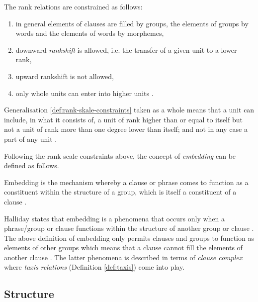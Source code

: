     \begin{generalization}\label{def:rank-skale-constraints}
    	The rank relations are constrained as follows:
    	\begin{enumerate}
            \item in general elements of clauses are filled by groups, the elements of groups by words and the elements of words by morphemes,
    		\item downward \textit{rankshift} is allowed, i.e. the transfer of a given unit to a lower rank,
    		\item upward rankshift is not allowed,
    		\item only whole units can enter into higher units \citep[44]{Halliday2002}.
    	\end{enumerate}
    \end{generalization}
    
    Generalisation \ref{def:rank-skale-constraints} taken as a whole means that a unit can include, in what it consists of, a unit of rank higher than or equal to itself but not a unit of rank more than one degree lower than itself; and not in any case a part of any unit \citep[42]{Halliday2002}. 
    
    Following the rank scale constraints above, the concept of \textit{embedding} can be defined as follows. 
    
    \begin{definition}[Embedding]\label{def:embedding0}
        Embedding is the mechanism whereby a clause or phrase comes to function as a constituent within the structure of a group, which is itself a constituent of a clause \citep[242]{Halliday2013}.
    \end{definition}
    
    Halliday states that embedding is a phenomena that occurs only when a \mbox{phrase/group} or clause functions within the structure of another group or clause \citep[242]{ifg2}. The above definition of embedding only permits clauses and groups to function as elements of other groups which means that a clause cannot fill the elements of another clause \citep[237]{Fawcett2000}. The latter phenomena is described in terms of \textit{clause complex} where \textit{taxis relations} (Definition \ref{def:taxis}) come into play.

\subsection{Structure}
\label{sec:structure-sydney}
    

